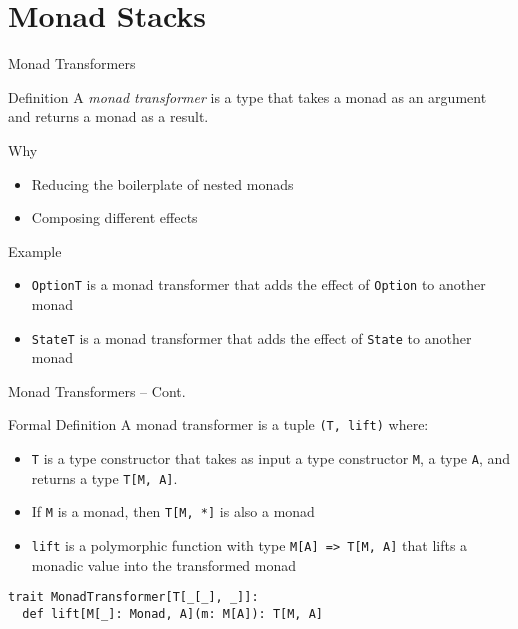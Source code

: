 \documentclass[presentation, 10pt]{beamer}\mode<presentation>{\usetheme{AMSBolognaFC}}
\begin{document}
\section{Monad Stacks}
\begin{frame}{Monad Transformers}
\begin{exampleblock}{Definition}
A \emph{monad transformer} is a type that takes a monad as an argument and returns a monad as a result.
\end{exampleblock}
\begin{alertblock}{Why}
	\begin{itemize}
		\item Reducing the boilerplate of nested monads
		\item Composing different effects
	\end{itemize}
\end{alertblock}
\begin{exampleblock}{Example}
	\begin{itemize}
		\item \texttt{OptionT} is a monad transformer that adds the effect of \texttt{Option} to another monad
		\item \texttt{StateT} is a monad transformer that adds the effect of \texttt{State} to another monad
	\end{itemize}
\end{exampleblock}
\end{frame}
\begin{frame}[fragile]{Monad Transformers -- Cont.}
\begin{alertblock}{Formal Definition}
	A monad transformer is a tuple \texttt{(T, lift)} where:
	\begin{itemize}
		\item \texttt{T} is a type constructor that takes as input a type constructor \texttt{M}, a type \texttt{A}, and returns a type \texttt{T[M, A]}.
		\item If \texttt{M} is a monad, then \texttt{T[M, *]} is also a monad
		\item \texttt{lift} is a polymorphic function with type \texttt{M[A] => T[M, A]} that lifts a monadic value into the transformed monad
	\end{itemize}
\end{alertblock}
\begin{tcolorbox}
\begin{verbatim}
trait MonadTransformer[T[_[_], _]]:
  def lift[M[_]: Monad, A](m: M[A]): T[M, A]
\end{verbatim}
\end{tcolorbox}
\end{frame}
\end{document}
